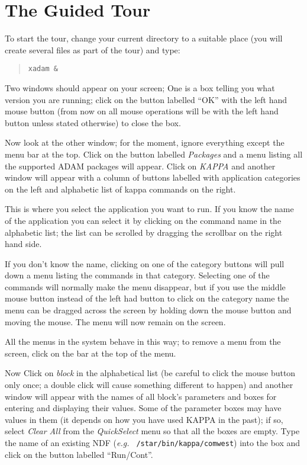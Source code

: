 \section{The Guided Tour}
\begin{list}{ 
}{\setlength{\rightmargin}{\leftmargin}}
\item To start the tour, change your current directory to a suitable 
place (you will create several files as
part of the tour) and type:

\begin{quote}
\tt xadam \&
\end{quote}

Two windows should appear on your screen; One is a box telling you what
version you are running; click on the button labelled ``OK'' with the
left hand mouse button (from now on all mouse operations will be with
the left hand button unless stated otherwise) to close the box.

\item Now look at the other window; for the moment, ignore everything
except the menu bar at the top.  Click on the button labelled {\em
Packages} and a menu listing all the supported ADAM packages will
appear.  Click on {\em KAPPA} and another window will appear with a
column of buttons labelled with application categories on the left and
alphabetic list of kappa commands on the right.

This is where you select the application you want to run. If you know
the name of the application you can select it by clicking on the
command name in the alphabetic list; the list can be scrolled by
dragging the scrollbar on the right hand side.

If you don't know the name, clicking on one of the category buttons
will pull down a menu listing the commands in that category. Selecting
one of the commands will normally make the menu disappear, but if you
use the middle mouse button instead of the left had button to click on
the category name the menu can be dragged across the screen by holding
down the mouse button and moving the mouse. The menu will now remain on
the screen.

All the menus in the system behave in this way; to remove a menu from the
screen, click on the bar at the top of the menu.

\item Now Click on {\em block} in the alphabetical list (be careful to
click the mouse button only once; a double click will cause something
different to happen) and another window will appear with the names of
all block's parameters and boxes for entering and displaying their
values.  Some of the parameter boxes may have values in them (it
depends on how you have used KAPPA in the past); if so, select {\em
Clear All} from the {\em QuickSelect} menu so that all the boxes are
empty.  Type the name of an existing NDF ({\em e.g.}\/ {\tt
/star/bin/kappa/comwest}) into the box and click on the button labelled
``Run/Cont''.


\end{list}
